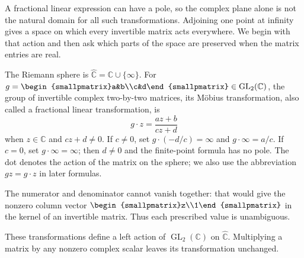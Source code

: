 A fractional linear expression can have a pole, so the complex plane alone is not the natural domain for all such transformations. Adjoining one point at infinity gives a space on which every invertible matrix acts everywhere. We begin with that action and then ask which parts of the space are preserved when the matrix entries are real.

\begin{definition}\label{hyperbolic.riemann-sphere}
The Riemann sphere is $\widehat{\mathbb C}=\mathbb C\cup\{\infty\}$. For $g=\begin{smallpmatrix}a&b\\c&d\end{smallpmatrix}\in\operatorname{GL}_2(\mathbb C)$, the group of invertible complex two-by-two matrices, its Möbius transformation, also called a fractional linear transformation, is
\[
 g\cdot z=\frac{az+b}{cz+d}
\]
when $z\in\mathbb C$ and $cz+d\ne0$. If $c\ne0$, set $g\cdot(-d/c)=\infty$ and $g\cdot\infty=a/c$. If $c=0$, set $g\cdot\infty=\infty$; then $d\ne0$ and the finite-point formula has no pole. The dot denotes the action of the matrix on the sphere; we also use the abbreviation $gz=g\cdot z$ in later formulas.
\end{definition}

The numerator and denominator cannot vanish together: that would give the nonzero column vector $\begin{smallpmatrix}z\\1\end{smallpmatrix}$ in the kernel of an invertible matrix. Thus each prescribed value is unambiguous.

\begin{proposition}\label{hyperbolic.sphere-action}
These transformations define a left action of $\operatorname{GL}_2(\mathbb C)$ on $\widehat{\mathbb C}$. Multiplying a matrix by any nonzero complex scalar leaves its transformation unchanged.
\end{proposition}

